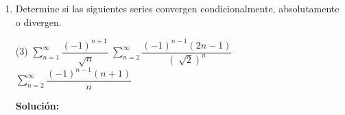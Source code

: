 \documentclass[12pt]{article}
\newenvironment{solucion}
{\begin{mdframed}[backgroundcolor=black!10]
		{\bf Solución:}\\
	}
	{
	\end{mdframed}
}
\newenvironment{preguntas}
{\begin{enumerate}\itemsep12pt
	}
	{
	\end{enumerate}
}
\newcommand{\ev}{\Big|}
\newcommand{\ra}{\rightarrow}
\begin{document}
\begin{preguntas}
\begin{solucion}
\begin{enumerate}[a)]
			\\
			Veamos ahora que pasa con $\sum\limits_{n=2}^{\infty} \dfrac{1}{nln(n)}$. Usando el criterio de la integral, tenemos que la serie se comportara igual a $\displaystyle\int_2^{\infty} \dfrac{1}{xln(x)}$. \\
			\\
			Calculemos entonces esta integral impropia,
			$$\displaystyle\int_2^{\infty} \dfrac{1}{xln(x)} =  ln(ln(x)) \ev_2^{\infty} = \infty$$
			Luego, $\displaystyle\int_2^{\infty} \dfrac{1}{xln(x)}$ diverge, por lo que por criterio de la integral, $\sum\limits_{n=2}^{\infty} \dfrac{1}{nln(n)}$ tambiém diverge. Finalmente, por el criterio de comparación al limite, la serie $\sum\limits_{n=2}^{\infty}\dfrac{n}{(n+1)^2ln(n)}$ es divergente.
\item $\sum\limits_{n=1}^{\infty}\dfrac{n!}{n^n}$\\
			\\
			Recordemos que en el infinito,
			$$n^n > n! > a^n > n > ln(n)$$
			El límite de la sucesión es
			$$\lim\limits_{n\ra\infty}\dfrac{n!}{n^n} = 0$$
			Usando el criterio de la razón,
			$$\lim\limits_{n \ra \infty} \dfrac{a_{n+1}}{a_n}
			= \lim\limits_{n \ra \infty} \dfrac{\dfrac{(n+1)!}{(n+1)^{n+1}}}{\dfrac{n!}{n^n}}
			= \lim\limits_{n \ra \infty} \dfrac{(n+1)!}{n!}\dfrac{n^n}{(n+1)^{n+1}}$$
			$$= \lim\limits_{n \ra \infty} \dfrac{(n+1)}{1}\dfrac{n^n}{(n+1)^{n+1}}
			= \lim\limits_{n \ra \infty} \dfrac{n^n}{(n+1)^{n}}
			= \lim\limits_{n \ra \infty} \left(\dfrac{n}{n+1}\right)^n$$
			$$= \lim\limits_{n \ra \infty} \dfrac{1}{\left(\dfrac{n+1}{n}\right)^n}
			= \dfrac{1}{e} < 1$$
			Por criterio de la razón, la serie es convergente.
\end{enumerate}
\end{solucion}
\item Determine si las siguientes series convergen condicionalmente, absolutamente o divergen.
\begin{tasks}(3)
\task $\sum\limits_{n=1}^{\infty}\dfrac{(-1)^{n+1}}{\sqrt[]{n}}$
\task $\sum\limits_{n=2}^{\infty}\dfrac{(-1)^{n-1}(2n-1)}{(\sqrt[]{2})^n}$
\task $\sum\limits_{n=2}^{\infty}\dfrac{(-1)^{n-1}(n+1)}{n}$
\end{tasks}
\begin{solucion}


\end{solucion}
\end{preguntas}
\end{document}
